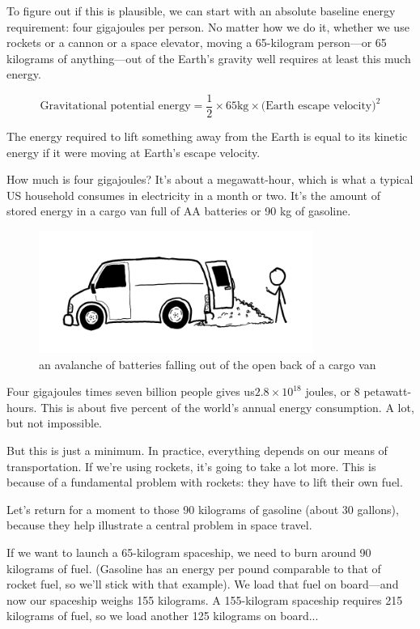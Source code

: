 {To figure out if this is plausible, we can start with an absolute baseline energy requirement: four gigajoules per person. No matter how we do it, whether we use rockets or a cannon or a space elevator, moving a 65-kilogram person—or 65 kilograms of anything—out of the Earth’s gravity well requires at least this much energy.}

{\[\text{Gravitational potential energy} =\frac{1}{2}\times 65\mathrm{kg}\times\text{(Earth escape velocity)}^{2}\]}

{The energy required to lift something away from the Earth is equal to its kinetic energy if it were moving at Earth’s escape velocity.}

{How much is four gigajoules? It’s about a megawatt-hour, which is what a typical US household consumes in electricity in a month or two. It’s the amount of stored energy in a cargo van full of AA batteries or 90 kg of gasoline.}

\begin{figure}[!htbp]
\centering
\includegraphics[scale=0.5, max width=0.8\textwidth]{imgs/a/7/everybody_out_cargo_van.png}
\caption{an avalanche of batteries falling out of the open back of a cargo van}
\end{figure}

{Four gigajoules times seven billion people gives us\(2.8\times 10^{18}\) joules, or 8 petawatt-hours. This is about five percent of the world’s annual energy consumption. A lot, but not impossible.}

{But this is just a minimum. In practice, everything depends on our means of transportation. If we’re using rockets, it’s going to take a lot more. This is because of a fundamental problem with rockets: they have to lift their own fuel.}

{Let’s return for a moment to those 90 kilograms of gasoline (about 30 gallons), because they help illustrate a central problem in space travel.}

{If we want to launch a 65-kilogram spaceship, we need to burn around 90 kilograms of fuel. (Gasoline has an energy per pound comparable to that of rocket fuel, so we’ll stick with that example). We load that fuel on board—and now our spaceship weighs 155 kilograms. A 155-kilogram spaceship requires 215 kilograms of fuel, so we load another 125 kilograms on board...}

